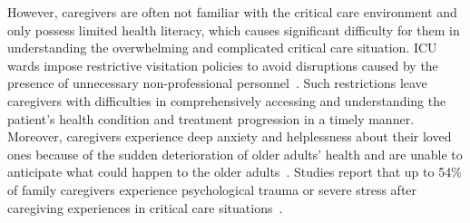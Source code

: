 However, caregivers are often not familiar with the critical care environment and only possess limited health literacy, which causes significant difficulty for them in understanding the overwhelming and complicated critical care situation.
ICU wards impose restrictive visitation policies to avoid disruptions caused by the presence of unnecessary non-professional personnel~\cite{dragoi2022visitation, tabah2022variation}. 
Such restrictions leave caregivers with difficulties in comprehensively accessing and understanding the patient's health condition and treatment progression in a timely manner.
Moreover, caregivers experience deep anxiety and helplessness about their loved ones because of the sudden deterioration of older adults' health and are unable to anticipate what could happen to the older adults~\cite{jennerich2020unplanned}.
Studies report that up to 54\% of family caregivers experience psychological trauma or severe stress after caregiving experiences in critical care situations~\cite{alfheim2019post}.


